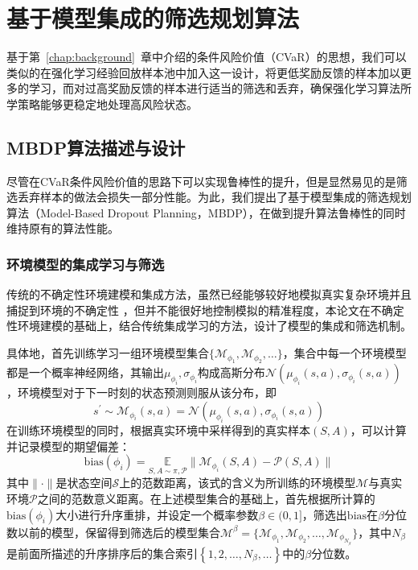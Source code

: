 
\chapter{基于模型集成的筛选规划算法}\label{chap:mbdp}

基于第~\ref{chap:background}~章中介绍的条件风险价值（CVaR）的思想，我们可以类似的在强化学习经验回放样本池中加入这一设计，将更低奖励反馈的样本加以更多的学习，而对过高奖励反馈的样本进行适当的筛选和丢弃，确保强化学习算法所学策略能够更稳定地处理高风险状态。

\section{MBDP算法描述与设计}

尽管在CVaR条件风险价值的思路下可以实现鲁棒性的提升，但是显然易见的是筛选丢弃样本的做法会损失一部分性能。为此，我们提出了基于模型集成的筛选规划算法（Model-Based Dropout Planning，MBDP），在做到提升算法鲁棒性的同时维持原有的算法性能。

\subsection{环境模型的集成学习与筛选}\label{sec:model-method}

传统的不确定性环境建模和集成方法，虽然已经能够较好地模拟真实复杂环境并且捕捉到环境的不确定性 \cite{duan2007multi}，但并不能很好地控制模拟的精准程度，本论文在不确定性环境建模的基础上，结合传统集成学习的方法，设计了模型的集成和筛选机制。

具体地，首先训练学习一组环境模型集合$\{\mathcal{M}_{\phi_1},\mathcal{M}_{\phi_2},\ldots\}$，集合中每一个环境模型都是一个概率神经网络，其输出$\mu_{\phi_i},\sigma_{\phi_i}$构成高斯分布$\mathcal{N}(\mu_{\phi_i}(s,a),\sigma_{\phi_i}(s,a))$，环境模型对于下一时刻的状态预测则服从该分布，即
\begin{equation}
    s^\prime \sim \mathcal{M}_{\phi_i}(s,a) = \mathcal{N}(\mu_{\phi_i}(s,a),\sigma_{\phi_i}(s,a))
\end{equation}
在训练环境模型的同时，根据真实环境中采样得到的真实样本$(S,A)$，可以计算并记录模型的期望偏差：
\begin{equation}
    \mathrm{bias}(\phi_i) = \underset{S,A\sim \pi,\mathcal{P}}{\mathbb{E}}\|\mathcal{M}_{\phi_i}(S,A)-\mathcal{P}(S,A)\|
\end{equation}
其中$\|\cdot\|$是状态空间$\mathcal{S}$上的范数距离，该式的含义为所训练的环境模型$\mathcal{M}$与真实环境$\mathcal{P}$之间的范数意义距离。在上述模型集合的基础上，首先根据所计算的$\mathrm{bias}(\phi_i)$大小进行升序重排，并设定一个概率参数$\beta\in(0,1]$，筛选出$\mathrm{bias}$在$\beta$分位数以前的模型，保留得到筛选后的模型集合$\mathcal{M}^\beta = \{\mathcal{M}_{\phi_1},\mathcal{M}_{\phi_2},\ldots,\mathcal{M}_{\phi_{N_\beta}}\}$，其中$N_\beta$是前面所描述的升序排序后的集合索引$\left\{1,2,\ldots,N_\beta,\ldots\right\}$中的$\beta$分位数。

